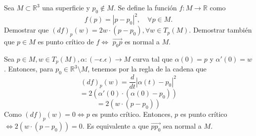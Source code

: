\begin{ejr}[4]
  Sea $M \subset \mathbb{R}^{3}$ una superficie y $p_{0} \not \in M$. Se define la función $f : M \to \mathbb{R}$ como
  \[
    f(p) = | p - p_{0} |^{2}, \quad \forall p \in M.
  \]
  Demostrar que $(d f)_{p}(w) = 2w \cdot (p - p_{0}), \forall w \in T_{p}(M)$. Demostrar también que $p \in M$ es punto crítico de $f \Leftrightarrow $ $\vec{p_{0} p}$ es normal a $M$.
\end{ejr}

\begin{sol}
  Sea $p \in M, w \in T_{p}(M), \alpha : (-\epsilon. \epsilon) \to M$ curva tal que $\alpha(0) = p$ y $\alpha'(0) = w$. Entonces, para $p_{0} \in \mathbb{R}^{3} \setminus M$, tenemos por la regla de la cadena que
  \[ 
    (d f)_{p}(w) = \frac{d{}}{d{t}} | \alpha(t) - p_{0} |^{2}
  \] 
  \[ 
    = 2(\alpha'(0) \cdot (\alpha(0) - p_{0})) 
  \] 
  \[ 
    = 2(w \cdot (p -p_{0})) 
  \] 
  Como $(d f)_{p}(w) = 0 \Leftrightarrow p$ es punto crítico. Entonces, $p$ es punto crítico $\Leftrightarrow 2(w \cdot (p - p_{0})) = 0$. Es equivalente a que $\vec{p p_{0}}$ sea normal a $M$.
\end{sol}
